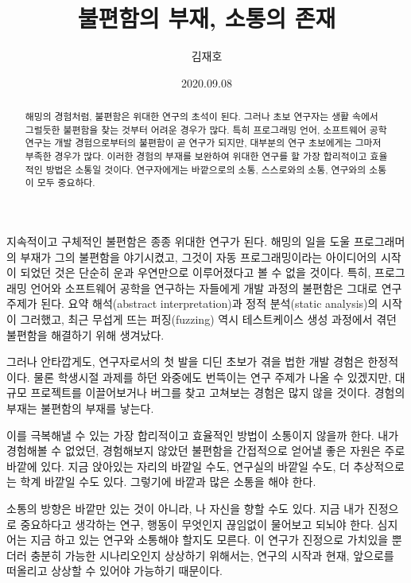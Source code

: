 \documentclass[11pt, oneside]{article}   	%
\title{불편함의 부재, 소통의 존재}
\author{김재호}
\date{2020.09.08}
\begin{document}
\maketitle


\begin{abstract}
    해밍의 경험처럼, 불편함은 위대한 연구의 초석이 된다. 그러나 초보 연구자는 생활 속에서 그럴듯한 불편함을 찾는 것부터 어려운 경우가 많다.
    특히 프로그래밍 언어, 소프트웨어 공학 연구는 개발 경험으로부터의 불편함이 곧 연구가 되지만, 대부분의 연구 초보에게는 그마저 부족한 경우가 많다.
    이러한 경험의 부재를 보완하여 위대한 연구를 할 가장 합리적이고 효율적인 방법은 소통일 것이다. 연구자에게는 바깥으로의 소통, 스스로와의 소통,
    연구와의 소통이 모두 중요하다.
\end{abstract}

지속적이고 구체적인 불편함은 종종 위대한 연구가 된다. 해밍의 일을 도울 프로그래머의 부재가 그의 불편함을 야기시켰고, 그것이 자동 프로그래밍이라는
아이디어의 시작이 되었던 것은 단순히 운과 우연만으로 이루어졌다고 볼 수 없을 것이다. 특히, 프로그래밍 언어와 소프트웨어 공학을 연구하는 자들에게
개발 과정의 불편함은 그대로 연구 주제가 된다. 요약 해석(abstract interpretation)과 정적 분석(static analysis)의 시작이 그러했고, 최근
무섭게 뜨는 퍼징(fuzzing) 역시 테스트케이스 생성 과정에서 겪던 불편함을 해결하기 위해 생겨났다.

그러나 안타깝게도, 연구자로서의 첫 발을 디딘 초보가 겪을 법한 개발 경험은 한정적이다. 물론 학생시절 과제를 하던 와중에도 번뜩이는 연구 주제가
나올 수 있겠지만, 대규모 프로젝트를 이끌어보거나 버그를 찾고 고쳐보는 경험은 많지 않을 것이다. 경험의 부재는 불편함의 부재를 낳는다.

이를 극복해낼 수 있는 가장 합리적이고 효율적인 방법이 소통이지 않을까 한다. 내가 경험해볼 수 없었던, 경험해보지 않았던 불편함을 간접적으로
얻어낼 좋은 자원은 주로 바깥에 있다. 지금 앉아있는 자리의 바깥일 수도, 연구실의 바깥일 수도, 더 추상적으로는 학계 바깥일 수도 있다. 그렇기에
바깥과 많은 소통을 해야 한다.

소통의 방향은 바깥만 있는 것이 아니라, 나 자신을 향할 수도 있다. 지금 내가 진정으로 중요하다고 생각하는 연구, 행동이 무엇인지 끊임없이 물어보고
되뇌야 한다. 심지어는 지금 하고 있는 연구와 소통해야 할지도 모른다. 이 연구가 진정으로 가치있을 뿐더러 충분히 가능한 시나리오인지 상상하기 위해서는,
연구의 시작과 현재, 앞으로를 떠올리고 상상할 수 있어야 가능하기 때문이다.
\end{document}
